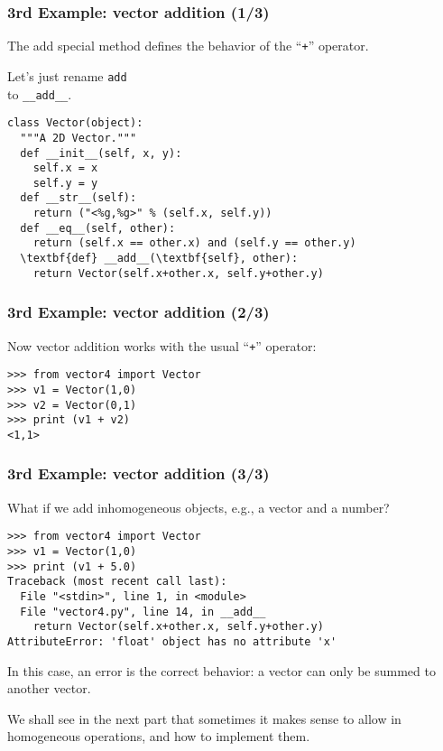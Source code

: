 \begin{frame}[fragile]\frametitle{3rd Example: vector addition (1/3)}
  

      The add special method defines the behavior of the
      ``\texttt{+}'' operator.

      
      Let's just rename \texttt{add} \\ to \texttt{\_\_add\_\_}.
\begin{lstlisting}
class Vector(object):
  """A 2D Vector."""
  def __init__(self, x, y):
    self.x = x
    self.y = y
  def __str__(self):
    return ("<%g,%g>" % (self.x, self.y))
  def __eq__(self, other):
    return (self.x == other.x) and (self.y == other.y)
  \textbf{def} __add__(\textbf{self}, other):
    return Vector(self.x+other.x, self.y+other.y)
\end{lstlisting}

\end{frame}

\begin{frame}[fragile]\frametitle{3rd Example: vector addition (2/3)}

  Now vector addition works with the usual ``\texttt{+}'' operator:
\begin{lstlisting}
>>> from vector4 import Vector
>>> v1 = Vector(1,0)
>>> v2 = Vector(0,1)
>>> print (v1 + v2)
<1,1>
\end{lstlisting}
\end{frame}

\begin{frame}[fragile]\frametitle{3rd Example: vector addition (3/3)}

  What if we add inhomogeneous objects, e.g., a vector and a number?
\begin{lstlisting}
>>> from vector4 import Vector
>>> v1 = Vector(1,0)
>>> print (v1 + 5.0)
Traceback (most recent call last):
  File "<stdin>", line 1, in <module>
  File "vector4.py", line 14, in __add__
    return Vector(self.x+other.x, self.y+other.y)
AttributeError: 'float' object has no attribute 'x'
\end{lstlisting}

   In this case, an error is the correct behavior: a vector can only
  be summed to another vector.

   We shall see in the next part that sometimes it makes sense to
  allow in homogeneous operations, and how to implement them.
\end{frame}

